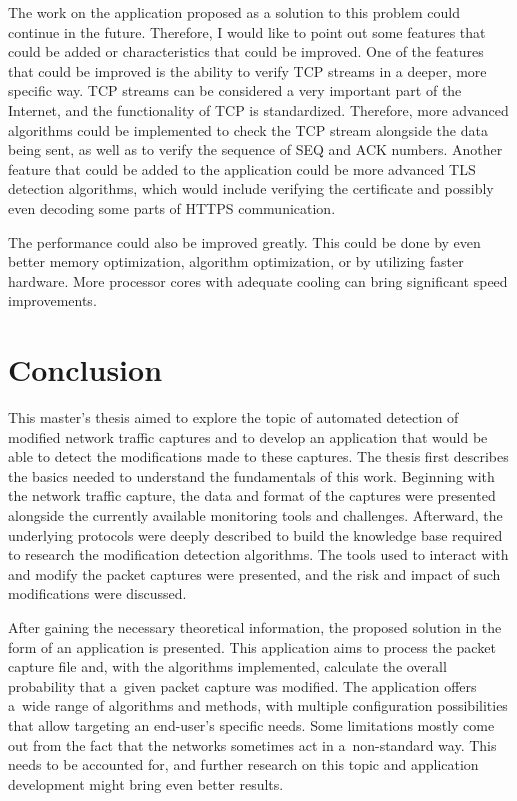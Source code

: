 \documentclass[
  printed,     %
  color,       %
  oneside,     %
  nosansbold,  %
  nocolorbold, %
  nolof,         %
  nolot,         %
]{fithesis4}
\begin{document}
The work on the application proposed as a solution to this problem could continue in the future. Therefore, I would like to point out some features that could be added or characteristics that could be improved. One of the features that could be improved is the ability to verify TCP streams in a deeper, more specific way. TCP streams can be considered a very important part of the Internet, and the functionality of TCP is standardized. Therefore, more advanced algorithms could be implemented to check the TCP stream alongside the data being sent, as well as to verify the sequence of SEQ and ACK numbers. Another feature that could be added to the application could be more advanced TLS detection algorithms, which would include verifying the certificate and possibly even decoding some parts of HTTPS communication. 

The performance could also be improved greatly. This could be done by even better memory optimization, algorithm optimization, or by utilizing faster hardware. More processor cores with adequate cooling can bring significant speed improvements.



\newpage
\chapter{Conclusion}

This master's thesis aimed to explore the topic of automated detection of modified network traffic captures and to develop an application that would be able to detect the modifications made to these captures. The thesis first describes the basics needed to understand the fundamentals of this work. Beginning with the network traffic capture, the data and format of the captures were presented alongside the currently available monitoring tools and challenges. Afterward, the underlying protocols were deeply described to build the knowledge base required to research the modification detection algorithms. The tools used to interact with and modify the packet captures were presented, and the risk and impact of such modifications were discussed. 

After gaining the necessary theoretical information, the proposed solution in the form of an application is presented. This application aims to process the packet capture file and, with the algorithms implemented, calculate the overall probability that a~given packet capture was modified. The application offers a~wide range of algorithms and methods, with multiple configuration possibilities that allow targeting an end-user's specific needs. Some limitations mostly come out from the fact that the networks sometimes act in a~non-standard way. This needs to be accounted for, and further research on this topic and application development might bring even better results. 
\end{document}

